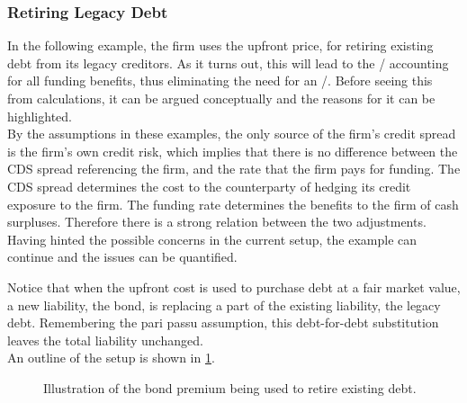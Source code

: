 \documentclass[main.tex]{subfiles}
\begin{document}
        \subsubsection{Retiring Legacy Debt}
            In the following example, the firm uses the upfront price,
            for retiring existing debt from its legacy creditors.
            As it turns out, this will lead to the \DVA/
            accounting for all funding benefits, thus eliminating the need for an \FVA/.
            Before seeing this from calculations, it can be argued conceptually
            and the reasons for it can be highlighted.
            \\
            By the assumptions in these examples,
            the only source of the firm's credit spread is the firm's own credit risk, 
            which implies that there is no difference between the CDS spread referencing the firm,
            and the rate that the firm pays for funding.
            The CDS spread determines the cost to the counterparty 
            of hedging its credit exposure to the firm.
            The funding rate determines the benefits to the firm of cash surpluses.
            Therefore there is a strong relation between the two adjustments.
            \\
            Having hinted the possible concerns in the current setup, 
            the example can continue and the issues can be quantified.

            Notice that when the upfront cost is used to purchase debt at a fair market value, 
            a new liability, the bond, is replacing a part of the existing liability, the legacy debt. 
            Remembering the pari passu assumption, this debt-for-debt substitution 
            leaves the total liability unchanged.
            \\
            An outline of the setup is shown in \cref{fig:debt-retiring-setup}.
            \begin{figure}[t]
                \centering
                \caption{Illustration of the bond premium being used to retire existing debt.}
                \label{fig:debt-retiring-setup}
            \end{figure}
\end{document}
